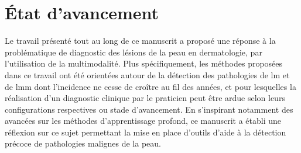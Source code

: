 \renewcommand{\thechapter}{\roman{chapter}}
\setcounter{chapter}{4}
\setcounter{figure}{0}

\label{chap:conclusion}

\section*{État d'avancement}
Le travail présenté tout au long de ce manuscrit a proposé une réponse à la problématique de diagnostic des lésions de la peau en dermatologie, par l'utilisation de la multimodalité. Plus spécifiquement, les méthodes proposées dans ce travail ont été orientées autour de la détection des pathologies de \gls{lm} et de \gls{lmm} dont l'incidence ne cesse de croître au fil des années, et pour lesquelles la réalisation d'un diagnostic clinique par le praticien peut être ardue selon leurs configurations respectives ou stade d'avancement. En s'inspirant notamment des avancées sur les méthodes d'apprentissage profond, ce manuscrit a établi une réflexion sur ce sujet permettant la mise en place d'outils d'aide à la détection précoce de pathologies malignes de la peau.\par

